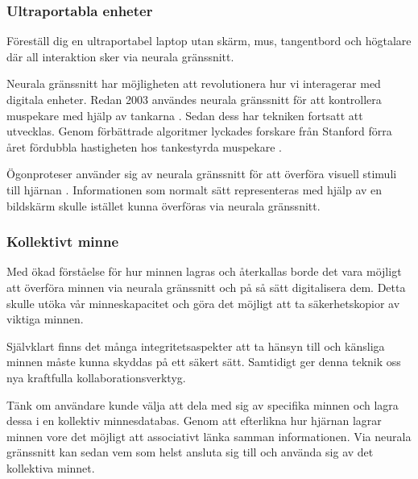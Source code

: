 \documentclass[12pt, a4paper]{article}
\begin{document}

\subsubsection{Ultraportabla enheter}

Föreställ dig en ultraportabel laptop utan skärm, mus, tangentbord och högtalare där all interaktion sker via neurala gränssnitt.

Neurala gränssnitt har möjligheten att revolutionera hur vi interagerar med digitala enheter. Redan 2003 användes neurala gränssnitt för att kontrollera muspekare med hjälp av tankarna \cite{cursor1}. Sedan dess har tekniken fortsatt att utvecklas. Genom förbättrade algoritmer lyckades forskare från Stanford förra året fördubbla hastigheten hos tankestyrda muspekare \cite{fast_cursor}.

Ögonproteser använder sig av neurala gränssnitt för att överföra visuell stimuli till hjärnan \cite{prosthetic_operation}. Informationen som normalt sätt representeras med hjälp av en bildskärm skulle istället kunna överföras via neurala gränssnitt.

%
%


\subsubsection{Kollektivt minne}

Med ökad förståelse för hur minnen lagras och återkallas borde det vara möjligt att överföra minnen via neurala gränssnitt och på så sätt digitalisera dem. Detta skulle utöka vår minneskapacitet och göra det möjligt att ta säkerhetskopior av viktiga minnen.

Självklart finns det många integritetsaspekter att ta hänsyn till och känsliga minnen måste kunna skyddas på ett säkert sätt. Samtidigt ger denna teknik oss nya kraftfulla kollaborationsverktyg.

Tänk om användare kunde välja att dela med sig av specifika minnen och lagra dessa i en kollektiv minnesdatabas. Genom att efterlikna hur hjärnan lagrar minnen vore det möjligt att associativt länka samman informationen. Via neurala gränssnitt kan sedan vem som helst ansluta sig till och använda sig av det kollektiva minnet.
\end{document}
